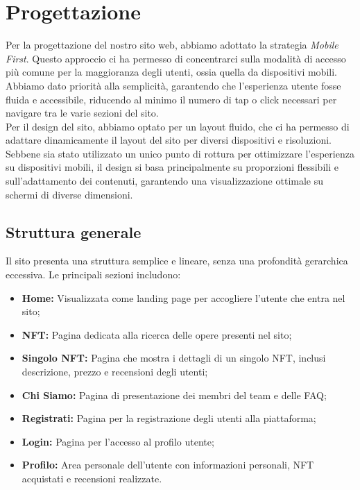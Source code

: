 \documentclass[10pt]{article}
\begin{document}
\section{Progettazione}
Per la progettazione del nostro sito web, abbiamo adottato la strategia \textit{Mobile First}. Questo approccio ci ha permesso di concentrarci sulla modalità di accesso più comune per la maggioranza degli utenti, ossia quella da dispositivi mobili. Abbiamo dato priorità alla semplicità, garantendo che l’esperienza utente fosse fluida e accessibile, riducendo al minimo il numero di tap o click necessari per navigare tra le varie sezioni del sito.\\
Per il design del sito, abbiamo optato per un layout fluido, che ci ha permesso di adattare dinamicamente il layout del sito per diversi dispositivi e risoluzioni. Sebbene sia stato utilizzato un unico punto di rottura per ottimizzare l’esperienza su dispositivi mobili, il design si basa principalmente su proporzioni flessibili e sull’adattamento dei contenuti, garantendo una visualizzazione ottimale su schermi di diverse dimensioni.

\subsection{Struttura generale}
Il sito presenta una struttura semplice e lineare, senza una profondità gerarchica eccessiva. Le principali sezioni includono:
\begin{itemize}
\item \textbf{Home:} Visualizzata come landing page per accogliere l'utente che entra nel sito;
\item \textbf{NFT:} Pagina dedicata alla ricerca delle opere presenti nel sito;
\item \textbf{Singolo NFT:} Pagina che mostra i dettagli di un singolo NFT, inclusi descrizione, prezzo e recensioni degli utenti;
\item \textbf{Chi Siamo:} Pagina di presentazione dei membri del team e delle FAQ;
\item \textbf{Registrati:} Pagina per la registrazione degli utenti alla piattaforma;
\item \textbf{Login:} Pagina per l'accesso al profilo utente;
\item \textbf{Profilo:} Area personale dell'utente con informazioni personali, NFT acquistati e recensioni realizzate.
\end{itemize}
\end{document}

